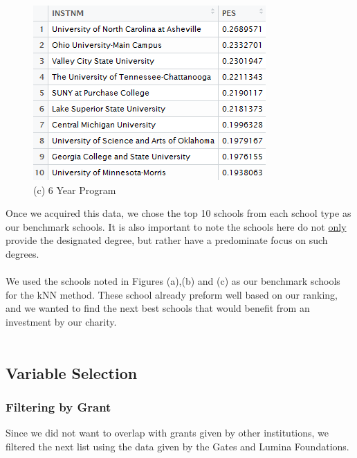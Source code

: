 \documentclass[12pt]{scrartcl}
\begin{document}
		\begin{figure}
		\centering
		\includegraphics*[width=0.90\linewidth]{6yr-col.png}\caption*{(c) 6 Year Program}
		\end{figure} 	
		Once we acquired this data, we chose the top 10 schools from each school type as our benchmark schools. It is also important to note the schools here do not \underline{only} provide the designated degree, but rather have a predominate focus on such degrees.\\
		\\
		We used the schools noted in Figures (a),(b) and (c) as our benchmark schools for the kNN method. These school already preform well based on our ranking, and we wanted to find the next best schools that would benefit from an investment by our charity.
		\\
		\\
	\subsection{Variable Selection}
		\subsubsection{Filtering by Grant}
			Since we did not want to overlap with grants given by other institutions, we filtered the next list using the data given by the Gates\cite{Bill} and Lumina \cite{Grant} Foundations.\\
		
\end{document}
